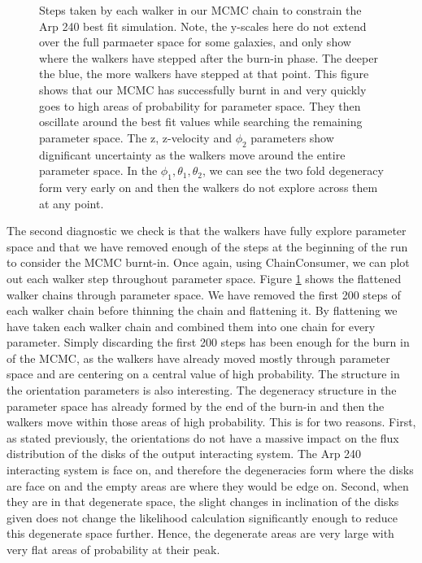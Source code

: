 \begin{figure}
    \caption{Steps taken by each walker in our MCMC chain to constrain the Arp 240 best fit simulation. Note, the y-scales here do not extend over the full parmaeter space for some galaxies, and only show where the walkers have stepped after the burn-in phase. The deeper the blue, the more walkers have stepped at that point. This figure shows that our MCMC has successfully burnt in and very quickly goes to high areas of probability for parameter space. They then oscillate around the best fit values while searching the remaining parameter space. The z, z-velocity and $\phi_{2}$ parameters show dignificant uncertainty as the walkers move around the entire parameter space. In the $\phi_{1}, \theta_{1}, \theta_{2}$, we can see the two fold degeneracy form very early on and then the walkers do not explore across them at any point.}
    \label{fig:walker_steps}
\end{figure}

The second diagnostic we check is that the walkers have fully explore parameter space and that we have removed enough of the steps at the beginning of the run to consider the MCMC burnt-in. Once again, using ChainConsumer, we can plot out each walker step throughout parameter space. Figure \ref{fig:walker_steps} shows the flattened walker chains through parameter space. We have removed the first 200 steps of each walker chain before thinning the chain and flattening it. By flattening we have taken each walker chain and combined them into one chain for every parameter. Simply discarding the first 200 steps has been enough for the burn in of the MCMC, as the walkers have already moved mostly through parameter space and are centering on a central value of high probability. The structure in the orientation parameters is also interesting. The degeneracy structure in the parameter space has already formed by the end of the burn-in and then the walkers move within those areas of high probability. This is for two reasons. First, as stated previously, the orientations do not have a massive impact on the flux distribution of the disks of the output interacting system. The Arp 240 interacting system is face on, and therefore the degeneracies form where the disks are face on and the empty areas are where they would be edge on. Second, when they are in that degenerate space, the slight changes in inclination of the disks given does not change the likelihood calculation significantly enough to reduce this degenerate space further. Hence, the degenerate areas are very large with very flat areas of probability at their peak.

